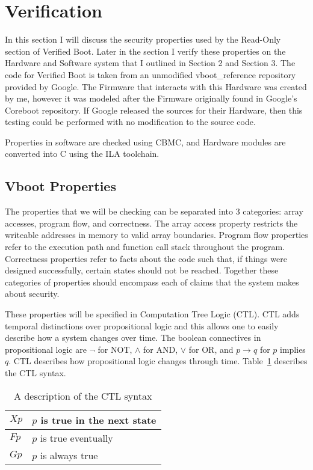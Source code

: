 \documentclass[../report.tex]{subfiles}
\begin{document}
\onehalfspacing

\pagebreak
\section{Verification}\label{sec:Verif}

In this section I will discuss the security properties used by the Read-Only
section of Verified Boot. 
Later in the section I verify these properties on the Hardware and
Software system that I outlined in Section 2 and Section 3.
The code for Verified Boot is taken from an unmodified vboot\_reference repository provided by Google. 
The Firmware that interacts with this Hardware was created by me, however it was 
modeled after the Firmware originally found in Google's Coreboot repository. 
If Google released the sources for their Hardware, then this testing could be
performed with no modification to the source code. 

Properties in software are checked using CBMC, and Hardware modules are
converted into C using the ILA toolchain.

\subsection{Vboot Properties}

The properties that we will be checking can be separated into 3 categories: array accesses, program flow, and correctness.
The array access property restricts the writeable addresses in memory to valid array boundaries. 
Program flow properties refer to the execution path and function call stack throughout the program.
Correctness properties refer to facts about the code such that, if things were
designed successfully, certain states should not be reached.
Together these categories of properties should encompass each of claims that the system makes about security.

These properties will be specified in Computation Tree Logic (CTL). 
CTL adds temporal distinctions over propositional logic and this allows one to easily describe how a system changes over time.
The boolean connectives in propositional logic are $\lnot$ for NOT, $\land$ for
AND, $\lor$ for OR, and $p \to q$ for $p$ implies $q$.
CTL describes how propositional logic changes through time.
Table~\ref{ctl_syn} describes the CTL syntax.

\begin{table}[!htbp]
    \centering
    \caption{A description of the CTL syntax}\label{ctl_syn}
    \begin{tabular}{|l|l|}
        \hline
        $Xp$ & $p$ is true in the next state\\ \hline
        $Fp$ & $p$ is true eventually\\ \hline
        $Gp$ & $p$ is always true\\ \hline
    \end{tabular}
\end{table}
\end{document}
